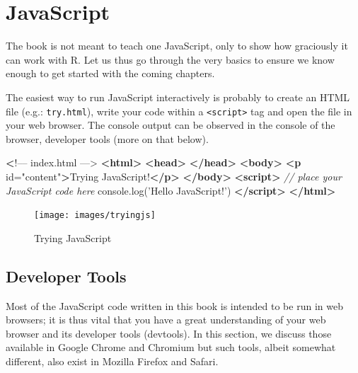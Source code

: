 \documentclass[10pt,]{krantz}
\makeatletter
\newenvironment{Shaded}{\begin{snugshade}}{\end{snugshade}}
\newcommand{\AttributeTok}[1]{\textcolor[rgb]{0.61,0.61,0.61}{#1}}
\newcommand{\CommentTok}[1]{\textcolor[rgb]{0.37,0.37,0.37}{\textit{#1}}}
\newcommand{\ErrorTok}[1]{\textcolor[rgb]{0.14,0.14,0.14}{\textbf{#1}}}
\newcommand{\KeywordTok}[1]{\textcolor[rgb]{0.27,0.27,0.27}{\textbf{#1}}}
\newcommand{\NormalTok}[1]{#1}
\newcommand{\OtherTok}[1]{\textcolor[rgb]{0.37,0.37,0.37}{#1}}
\newcommand{\StringTok}[1]{\textcolor[rgb]{0.5,0.5,0.5}{#1}}
\newcommand{\VariableTok}[1]{\textcolor[rgb]{0,0,0}{#1}}
\newenvironment{kframe}{%
\medskip{}
\setlength{\fboxsep}{.8em}
 \def\at@end@of@kframe{}%
 \ifinner\ifhmode%
  \def\at@end@of@kframe{\end{minipage}}%
  \begin{minipage}{\columnwidth}%
 \fi\fi%
 \def\FrameCommand##1{\hskip\@totalleftmargin \hskip-\fboxsep
 \colorbox{shadecolor}{##1}\hskip-\fboxsep
     \hskip-\linewidth \hskip-\@totalleftmargin \hskip\columnwidth}%
 \MakeFramed {\advance\hsize-\width
   \@totalleftmargin\z@ \linewidth\hsize
   \@setminipage}}%
 {\par\unskip\endMakeFramed%
 \at@end@of@kframe}
\renewenvironment{Shaded}{\begin{kframe}}{\end{kframe}}
\makeatother
\begin{document}
\hypertarget{basics-javascript}{%
\section{JavaScript}\label{basics-javascript}}

The book is not meant to teach one JavaScript, only to show how graciously it can work with R. Let us thus go through the very basics to ensure we know enough to get started with the coming chapters.

The easiest way to run JavaScript interactively is probably to create an HTML file (e.g.: \texttt{try.html}), write your code within a \texttt{\textless{}script\textgreater{}} tag and open the file in your web browser. The console output can be observed in the console of the browser, developer tools (more on that below).

\begin{Shaded}
\begin{Highlighting}[]
\ErrorTok{<}\NormalTok{!–– index.html ––>}
\KeywordTok{<html>}
  \KeywordTok{<head>}
  \KeywordTok{</head>}
  \KeywordTok{<body>}
    \KeywordTok{<p}\OtherTok{ id=}\StringTok{"content"}\KeywordTok{>}\NormalTok{Trying JavaScript!}\KeywordTok{</p>}
  \KeywordTok{</body>}
  \KeywordTok{<script>}
    \CommentTok{// place your JavaScript code here}
    \VariableTok{console}\NormalTok{.}\AttributeTok{log}\NormalTok{(}\StringTok{'Hello JavaScript!'}\NormalTok{)}
  \KeywordTok{</script>}
\KeywordTok{</html>}
\end{Highlighting}
\end{Shaded}

\begin{figure}[H]

{\centering \texttt{[image: images/tryingjs]} 

}

\caption{Trying JavaScript}\label{fig:trying-js}
\end{figure}

\hypertarget{basics-chrome-devtools}{%
\subsection{Developer Tools}\label{basics-chrome-devtools}}

Most of the JavaScript code written in this book is intended to be run in web browsers; it is thus vital that you have a great understanding of your web browser and its developer tools (devtools). In this section, we discuss those available in Google Chrome and Chromium but such tools, albeit somewhat different, also exist in Mozilla Firefox and Safari.
\end{document}
